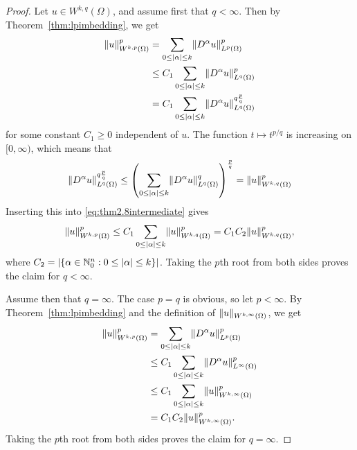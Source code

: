 \documentclass[english, 12pt, a4paper, sci, utf8, a-2b, online]{aaltothesis}
\theoremstyle{definition}
\theoremstyle{plain}
\DeclarePairedDelimiter\abs{\lvert}{\rvert}
\DeclarePairedDelimiter\norm{\lVert}{\rVert}
\numberwithin{equation}{section}
\begin{document}
\begin{proof}
    Let $u \in W^{k,q}(\Omega)$, and assume first that $q < \infty$.
    Then by Theorem~\ref{thm:lpimbedding}, we get
    \begin{align}
        \norm{u}_{W^{k,p}(\Omega)}^p
        &= \sum_{0 \leq \abs{\alpha} \leq k} \norm{D^{\alpha} u}_{L^p(\Omega)}^p
            \nonumber \\
        &\leq C_1 \sum_{0 \leq \abs{\alpha} \leq k}
            \norm{D^{\alpha} u}_{L^q(\Omega)}^p \nonumber \\
        \label{eq:thm2.8intermediate}
        &= C_1 \sum_{0 \leq \abs{\alpha} \leq k}
            \norm{D^{\alpha} u}_{L^q(\Omega)}^{q \frac{p}{q}}
    \end{align}
    for some constant $C_1 \geq 0$ independent of $u$.
    The function $t \mapsto t^{p/q}$ is increasing on $[0, \infty)$,
    which means that
    \begin{equation*}
        \norm{D^{\alpha} u}_{L^q(\Omega)}^{q \frac{p}{q}}
        \leq \left( \sum_{0 \leq \abs{\alpha} \leq k}
            \norm{D^{\alpha} u}_{L^q(\Omega)}^{q}
                \right)^{\frac{p}{q}}
        = \norm{u}_{W^{k,q}(\Omega)}^p
    \end{equation*}
    Inserting this into \eqref{eq:thm2.8intermediate} gives
    \begin{equation*}
        \norm{u}_{W^{k,p}(\Omega)}^p
        \leq C_1 \sum_{0 \leq \abs{\alpha} \leq k} \norm{u}_{W^{k,q}(\Omega)}^p
        = C_1 C_2 \norm{u}_{W^{k,q}(\Omega)}^p,
    \end{equation*}
    where
    $C_2 = \abs{\{ \alpha \in \mathbb{N}_0^n : 0 \leq \abs{\alpha} \leq k \}}$.
    Taking the $p$th root from both sides proves the claim for $q < \infty$.

    Assume then that $q = \infty$. The case $p=q$ is obvious, so let $p < \infty$.
    By Theorem~\ref{thm:lpimbedding} and the definition of
    $\norm{u}_{W^{k,\infty}(\Omega)}$, we get
    \begin{align*}
        \norm{u}_{W^{k,p}(\Omega)}^p
        &= \sum_{0 \leq \abs{\alpha} \leq k} \norm{D^{\alpha} u}_{L^p(\Omega)}^p \\
        &\leq C_1 \sum_{0 \leq \abs{\alpha} \leq k}
            \norm{D^{\alpha} u}_{L^{\infty}(\Omega)}^p \\
        &\leq C_1 \sum_{0 \leq \abs{\alpha} \leq k}
            \norm{u}_{W^{k,\infty}(\Omega)}^p \\
        &= C_1 C_2 \norm{u}_{W^{k,\infty}(\Omega)}^p.
    \end{align*}
    Taking the $p$th root from both sides proves the claim for $q=\infty$.
\end{proof}
\end{document}
